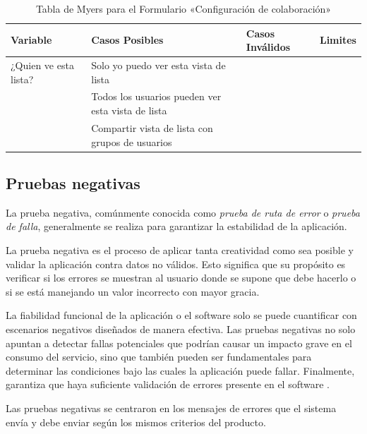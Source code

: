 \begin{table}[H]
\centering
\begin{tabular}{|l|l|l|l|}
\hline
\footnotesize{\textbf{Variable}} & \footnotesize{\textbf{Casos Posibles}} & \footnotesize{\textbf{Casos Inválidos}} & \footnotesize{\textbf{Limites}} \\
\hline
\footnotesize{¿Quien ve esta lista?} & \footnotesize{Solo yo puedo ver esta vista de lista} & & \\
& \footnotesize{Todos los usuarios pueden ver esta vista de lista} & & \\
& \footnotesize{Compartir vista de lista con grupos de usuarios} & & \\
\hline
\end{tabular}
\caption{Tabla de Myers para el Formulario «Configuración de colaboración»}
\label{myers_09}
\end{table}

\subsection{Pruebas negativas}
La prueba negativa, comúnmente conocida como \emph{prueba de ruta de error} o
\emph{prueba de falla}, generalmente se realiza para garantizar la estabilidad
de la aplicación.

La prueba negativa es el proceso de aplicar tanta creatividad como sea posible y
validar la aplicación contra datos no válidos. Esto significa que su propósito
es verificar si los errores se muestran al usuario donde se supone que debe
hacerlo o si se está manejando un valor incorrecto con mayor gracia.

La fiabilidad funcional de la aplicación o el software solo se puede cuantificar
con escenarios negativos diseñados de manera efectiva. Las pruebas negativas no
solo apuntan a detectar fallas potenciales que podrían causar un impacto grave
en el consumo del servicio, sino que también pueden ser fundamentales para
determinar las condiciones bajo las cuales la aplicación puede fallar.
Finalmente, garantiza que haya suficiente validación de errores presente en el
software \cite{Nadig}.

Las pruebas negativas se centraron en los mensajes de errores que el sistema
envía y debe enviar según los mismos criterios del producto.

